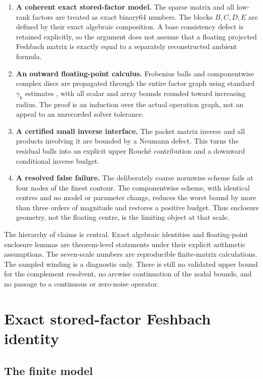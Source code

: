 \documentclass[11pt]{article}
\theoremstyle{definition}
\theoremstyle{remark}
\begin{document}
\begin{enumerate}
 \item \textbf{A coherent exact stored-factor model.}  The sparse matrix and
 all low-rank factors are treated as exact binary64 numbers.  The blocks
 \(B,C,D,E\) are defined by their exact algebraic composition.  A base
 consistency defect is retained explicitly, so the argument does not assume
 that a floating projected Feshbach matrix is exactly equal to a separately
 reconstructed ambient formula.
 \item \textbf{An outward floating-point calculus.}  Frobenius balls and
 componentwise complex discs are propagated through the entire factor
 graph using standard \(\gamma_k\) estimates \citep{Higham2002}, with all
 scalar and array bounds rounded toward increasing radius.  The proof is an
 induction over the actual operation graph, not an appeal to an unrecorded
 solver tolerance.
 \item \textbf{A certified small inverse interface.}  The packet matrix
 inverse and all products involving it are bounded by a Neumann defect.
 This turns the residual balls into an explicit upper Rouch\'e contribution
 and a downward conditional inverse budget.
 \item \textbf{A resolved false failure.}  The deliberately coarse normwise
 scheme fails at four nodes of the finest contour.  The componentwise
 scheme, with identical centres and no model or parameter change, reduces
 the worst bound by more than three orders of magnitude and restores a
 positive budget.  Thus enclosure geometry, not the floating centre, is the
 limiting object at that scale.
\end{enumerate}

The hierarchy of claims is central.  Exact algebraic identities and
floating-point enclosure lemmas are theorem-level statements under their
explicit arithmetic assumptions.  The seven-scale numbers are reproducible
finite-matrix calculations.  The sampled winding is a diagnostic only.
There is still no validated upper bound for the complement resolvent, no
arcwise continuation of the nodal bounds, and no passage to a continuous or
zero-noise operator.

\section{Exact stored-factor Feshbach identity}
\label{sec:identity}

\subsection{The finite model}
\end{document}

